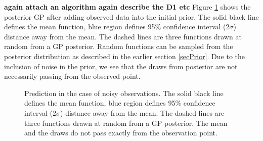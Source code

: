 \begin{mdframed}[hidealllines=true,backgroundcolor=lightgray!20]

\textbf{again attach an algorithm
\textbf{again describe the D1 etc}}
Figure \ref{figGPNoisyPosteriors} shows the posterior GP after adding observed data into the initial prior. The solid black line defines the mean function, blue region defines 95\% confidence interval (2$\sigma$) distance away from the mean. The dashed lines are three functions drawn at random from a GP posterior. Random functions can be sampled from the posterior distribution as described in the earlier section \ref{secPrior}.  Due to the inclusion of noise in the prior, we see that the draws from posterior are not necessarily passing from the observed point.
\end{mdframed}

\begin{figure}[!ht]
  \centering
    \quad
{}\quad
  
       \caption{Prediction in the case of noisy observations. The solid black line defines the mean function, blue region defines 95\% confidence interval (2$\sigma$) distance away from the mean. The dashed lines are three functions drawn at random from a GP posterior. The mean and the draws do not pass exactly from the observation point.}
       \label{figGPNoisyPosteriors}
\end{figure}

